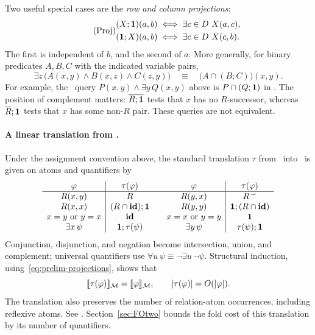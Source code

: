 Two useful special cases are the \emph{row and column projections}:
\begin{equation*}\tag{Proj}\label{eq:prelim-projections}
 \begin{aligned}
  (X;\mathbf{1})(a,b)&\iff\exists c\in D\ X(a,c),\\
  (\mathbf{1};X)(a,b)&\iff\exists c\in D\ X(c,b).
 \end{aligned}
\end{equation*}
The first is independent of $b$, and the second of $a$. More generally,
for binary predicates $A,B,C$ with the indicated variable pairs,
\begin{equation*}\tag{QE}\label{eq:prelim-elimination}
 \exists z\,\bigl(A(x,y)\land B(x,z)\land C(z,y)\bigr)
 \quad\equiv\quad \bigl(A\cap(B;C)\bigr)(x,y).
\end{equation*}
For example, the \FOtwo\ query
$P(x,y)\land\exists y\,Q(x,y)$ above is $P\cap(Q;\mathbf{1})$ in \CoR.
The position of complement matters: $\overline{R;\mathbf{1}}$ tests that
$x$ has no $R$-successor, whereas $\overline R;\mathbf{1}$ tests that
$x$ has some non-$R$ pair. These queries are not equivalent.

\paragraph{A linear translation from \FOtwo.}\label{sec:FOtwo-translation}
Under the assignment convention above, the standard translation
$\tau$ from \FOtwo\ into \CoR\ is given on atoms and quantifiers by
\[
\begin{array}{c|c@{\qquad}c|c}
 \varphi&\tau(\varphi)&\varphi&\tau(\varphi)\\\hline
 R(x,y)&R&R(y,x)&R^\smile\\
 R(x,x)&(R\cap\id);\one&R(y,y)&\one;(R\cap\id)\\
 x=y\ \text{or}\ y=x&\id&x=x\ \text{or}\ y=y&\one\\
 \exists x\,\psi&\one;\tau(\psi)&
 \exists y\,\psi&\tau(\psi);\one
\end{array}
\]
Conjunction, disjunction, and negation become intersection, union, and
complement; universal quantifiers use
$\forall u\,\psi\equiv\neg\exists u\,\neg\psi$. Structural induction,
using~\eqref{eq:prelim-projections}, shows that
\[
 \llbracket \tau(\varphi)\rrbracket_{\mathcal M}
   =\llbracket \varphi\rrbracket_{\mathcal M},\qquad
 |\tau(\varphi)|=O(|\varphi|).
\]
The translation also preserves the number of relation-atom
occurrences, including reflexive atoms. See
\citep[Remark~3.22]{nakamura2022}. Section~\ref{sec:FOtwo} bounds the fold cost of this translation
by its number of quantifiers.

